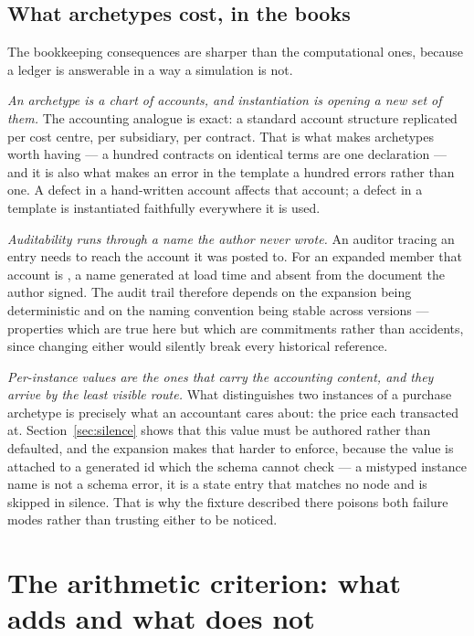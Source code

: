 \documentclass[11pt,a4paper]{article}
\begin{document}
\subsection{What archetypes cost, in the books}

The bookkeeping consequences are sharper than the computational ones, because a ledger is answerable in a way a simulation is not.

\emph{An archetype is a chart of accounts, and instantiation is opening a new set of them.} The accounting analogue is exact: a standard account structure replicated per cost centre, per subsidiary, per contract. That is what makes archetypes worth having --- a hundred contracts on identical terms are one declaration --- and it is also what makes an error in the template a hundred errors rather than one. A defect in a hand-written account affects that account; a defect in a template is instantiated faithfully everywhere it is used.

\emph{Auditability runs through a name the author never wrote.} An auditor tracing an entry needs to reach the account it was posted to. For an expanded member that account is , a name generated at load time and absent from the document the author signed. The audit trail therefore depends on the expansion being deterministic and on the naming convention being stable across versions --- properties which are true here but which are commitments rather than accidents, since changing either would silently break every historical reference.

\emph{Per-instance values are the ones that carry the accounting content, and they arrive by the least visible route.} What distinguishes two instances of a purchase archetype is precisely what an accountant cares about: the price each transacted at. Section~\ref{sec:silence} shows that this value must be authored rather than defaulted, and the expansion makes that harder to enforce, because the value is attached to a generated id which the schema cannot check --- a mistyped instance name is not a schema error, it is a state entry that matches no node and is skipped in silence. That is why the fixture described there poisons both failure modes rather than trusting either to be noticed.


\section{The arithmetic criterion: what adds and what does not}
\label{sec:additivity}
\end{document}
